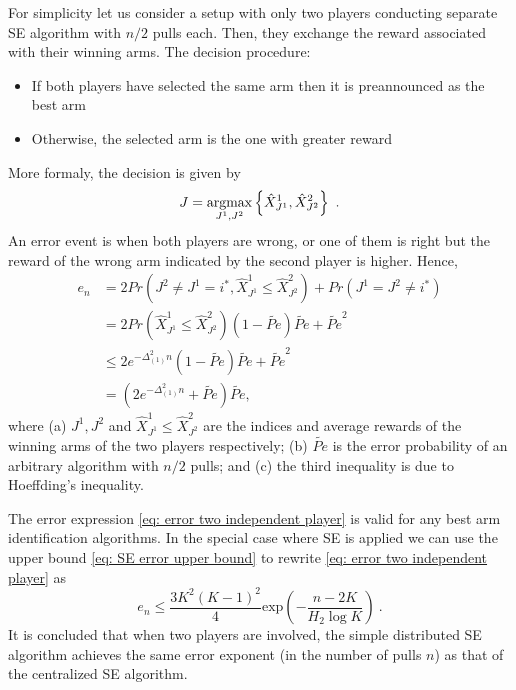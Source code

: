 \documentclass{sig-alternate}
\newcommand{\set}[1]{\left\{#1\right\}}
\newcommand{\paren}[1]{\left( #1 \right)}
\newcommand{\argmax}{\operatornamewithlimits{argmax}}
\begin{document}
For simplicity let us consider a setup with only two players conducting separate SE algorithm with $n/2$ pulls each. Then, they exchange the reward associated with their winning arms. The decision procedure:
\begin{itemize}
    \item If both players have selected the same arm then it is preannounced as the best arm
\item Otherwise, the selected arm is the one with greater reward
\end{itemize}
More formaly, the decision is given by
\begin{equation}
    J=\argmax_{J^1,J^2}\set{\hat{X}^1_{J^1},\hat{X}^2_{J^2}}\ .
\end{equation}
An error event is when both players are wrong, or one of them is right but the reward of the wrong arm indicated by the second player is higher. Hence,
\begin{equation}
\begin{aligned}\label{eq: error two independent player}
e_n &= 2 Pr \paren{J^2\neq J^1=i^*,\hat{X}^1_{J^1}\le\hat{X}^2_{J^2}}+Pr\paren{J^1=J^2\neq i^*}\\
&= 2 Pr\paren{\hat{X}^1_{J^1}\le\hat{X}^2_{J^2}}\paren{1-\widetilde{Pe}}\widetilde{Pe}+\widetilde{Pe}^2\\
&\le 2 e^{-\Delta_{(1)}^2 n}\paren{1-\widetilde{Pe}}\widetilde{Pe}+\widetilde{Pe}^2\\
&= \paren{2 e^{-\Delta_{(1)}^2 n}+\widetilde{Pe}}\widetilde{Pe},
\end{aligned}
\end{equation}
where (a) $J^1,J^2$ and $\hat{X}^1_{J^1}\le\hat{X}^2_{J^2}$ are the indices and average rewards of the winning arms of the two players respectively; (b) $\widetilde{Pe}$ is the error probability of an arbitrary algorithm with $n/2$ pulls; and (c) the third inequality is due to Hoeffding's inequality.

The error expression \eqref{eq: error two independent player} is valid for any best arm identification algorithms. In the special case where SE is applied we can use the upper bound \eqref{eq: SE error upper bound} to rewrite \eqref{eq: error two independent player} as
\begin{equation}
    e_n\le \frac{3K^2\paren{K-1}^2}{4}\mathrm{exp}\paren{-\frac{n-2K}{H_2\log K}}\ .
\end{equation}
It is concluded that when two players are involved, the simple distributed SE algorithm achieves the same error exponent (in the number of pulls $n$) as that of the centralized SE algorithm.
\end{document}
